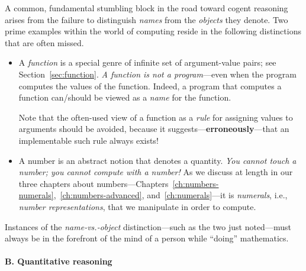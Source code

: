 A common, fundamental stumbling block in the road toward cogent reasoning arises from the failure to distinguish {\em names} from the {\em objects} they denote.  Two prime examples within the world of computing reside in the following distinctions that are often missed.
\begin{itemize}
\item
A {\it function} is a special genre of infinite set of argument-value pairs; see Section~\ref{sec:function}.  {\em A function is not a program}---even when the program computes the values of the function.  Indeed, a program that computes a function can/should be
viewed as a {\it name} for the function.

\smallskip

Note that the often-used view of a function as a {\em rule} for assigning values to arguments should be avoided, because it suggests---{\bf erroneously}---that an implementable such rule always exists!

\medskip\item
A number is an abstract notion that denotes a quantity.  {\em You cannot touch a number; you cannot compute with a number!}  As we discuss at length in our three chapters about numbers---Chapters~\ref{ch:numbers-numerals},~\ref{ch:numbers-advanced}, and~\ref{ch:numerals}---it is {\em numerals}, i.e., {\em number representations}, that we manipulate in order to compute.
\end{itemize}
Instances of the {\em name-vs.-object} distinction---such as the two just noted---must always be in the forefront of the mind of a person while ``doing'' mathematics.

\paragraph{B. Quantitative reasoning}

